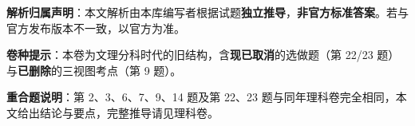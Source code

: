 

\begin{gknotice}
\textbf{ 解析归属声明}：本文解析由本库编写者根据试题\textbf{独立推导}，\textbf{非官方标准答案}。若与官方发布版本不一致，以官方为准。

\textbf{ 卷种提示}：本卷为文理分科时代的旧结构，含\textbf{现已取消}的选做题（第 22/23 题）与\textbf{已删除}的三视图考点（第 9 题）。

\textbf{重合题说明}：第 2、3、6、7、9、14 题及第 22、23 题与同年理科卷完全相同，本文给出结论与要点，完整推导请见理科卷。
\end{gknotice}

\par\medskip


